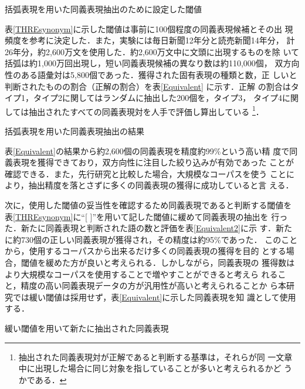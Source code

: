 \documentclass[japanese]{jnlp_1.4}
\begin{document}
  \begin{table}[b]
   \caption{括弧表現を用いた同義表現抽出のために設定した閾値}
   \label{THREsynonym}
   \begin{center}

   \end{center}
  \end{table}

  表\ref{THREsynonym}に示した閾値は事前に100個程度の同義表現候補とその出
  現頻度を参考に決定した．また，実験には毎日新聞12年分と読売新聞14年分，
  計26年分，約2,600万文を使用した．約2,600万文中に文頭に出現するものを除
  いて括弧は約1,000万回出現し，短い同義表現候補の異なり数は約110,000個，
  双方向性のある語彙対は5,800個であった．獲得された固有表現の種類と数，正
  しいと判断されたものの割合（正解の割合）を表\ref{Equivalent} に示す．正解
  の割合はタイプ1，タイプ2に関してはランダムに抽出した200個を，タイプ3，
  タイプ4に関しては抽出されたすべての同義表現対を人手で評価し算出している
  \footnote{抽出された同義表現対が正解であると判断する基準は，それらが同
  一文章中に出現した場合に同じ対象を指していることが多いと考えられるかど
  うかである．}．

  \begin{table}[t]
   \caption{括弧表現を用いた同義表現抽出の結果}
   \label{Equivalent}
   \begin{center}

   \end{center}
  \end{table}  

  表\ref{Equivalent}の結果から約2,600個の同義表現を精度約99\%という高い精
  度で同義表現を獲得できており，双方向性に注目した絞り込みが有効であった
  ことが確認できる．また，先行研究と比較した場合，大規模なコーパスを使う
  ことにより，抽出精度を落とさずに多くの同義表現の獲得に成功していると言
  える．
  
  次に，使用した閾値の妥当性を確認するため同義表現であると判断する閾値を
  表\ref{THREsynonym}に``[ ]''を用いて記した閾値に緩めて同義表現の抽出を
  行った．新たに同義表現と判断された語の数と評価を表\ref{Equivalent2}に示
  す．新たに約730個の正しい同義表現が獲得され，その精度は約95\%であった．
  このことから，使用するコーパスから出来るだけ多くの同義表現の獲得を目的
  とする場合，閾値を緩めた方が良いと考えられる．しかしながら，同義表現の
  獲得数はより大規模なコーパスを使用することで増やすことができると考えら
  れること，精度の高い同義表現データの方が汎用性が高いと考えられることか
  ら本研究では緩い閾値は採用せず，表\ref{Equivalent}に示した同義表現を知
  識として使用する．

  \begin{table}[t]
   \caption{緩い閾値を用いて新たに抽出された同義表現}
   \label{Equivalent2}
   \begin{center}

   \end{center}
  \end{table}  
\end{document}
